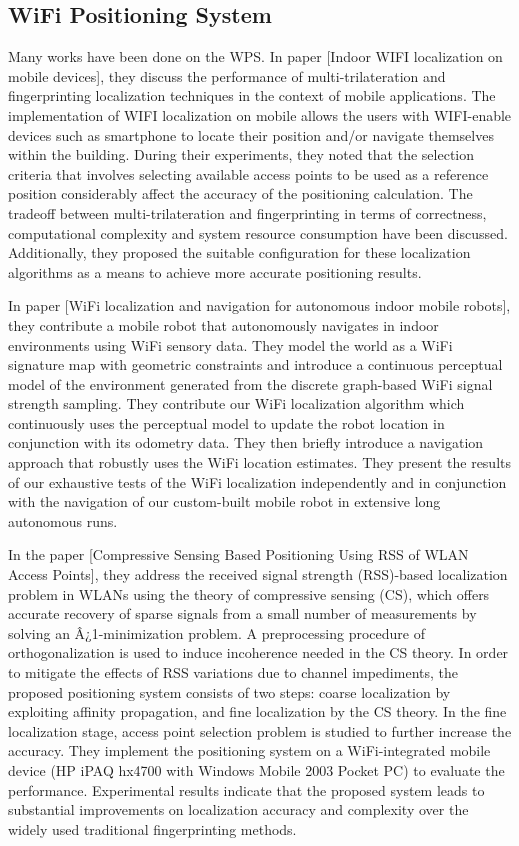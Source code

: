 \documentclass[12pt]{report}
\begin{document}
\subsection{WiFi Positioning System}
Many works have been done on the WPS. In paper [Indoor WIFI localization on mobile devices], they discuss the performance of multi-trilateration and fingerprinting localization techniques in the context of mobile applications. The implementation of WIFI localization on mobile allows the users with WIFI-enable devices such as smartphone to locate their position and/or navigate themselves within the building. During their experiments, they noted that the selection criteria that involves selecting available access points to be used as a reference position considerably affect the accuracy of the positioning calculation. The tradeoff between multi-trilateration and fingerprinting in terms of correctness, computational complexity and system resource consumption have been discussed. Additionally, they proposed the suitable configuration for these localization algorithms as a means to achieve more accurate positioning results.

In paper [WiFi localization and navigation for autonomous indoor mobile robots], they contribute a mobile robot that autonomously navigates in indoor environments using WiFi sensory data. They model the world as a WiFi signature map with geometric constraints and introduce a continuous perceptual model of the environment generated from the discrete graph-based WiFi signal strength sampling. They contribute our WiFi localization algorithm which continuously uses the perceptual model to update the robot location in conjunction with its odometry data. They then briefly introduce a navigation approach that robustly uses the WiFi location estimates. They present the results of our exhaustive tests of the WiFi localization independently and in conjunction with the navigation of our custom-built mobile robot in extensive long autonomous runs. 

In the paper [Compressive Sensing Based Positioning Using RSS of WLAN Access Points], they address the received signal strength (RSS)-based localization problem in WLANs using the theory of compressive sensing (CS), which offers accurate recovery of sparse signals from a small number of measurements by solving an Â¿1-minimization problem. A preprocessing procedure of orthogonalization is used to induce incoherence needed in the CS theory. In order to mitigate the effects of RSS variations due to channel impediments, the proposed positioning system consists of two steps: coarse localization by exploiting affinity propagation, and fine localization by the CS theory. In the fine localization stage, access point selection problem is studied to further increase the accuracy. They implement the positioning system on a WiFi-integrated mobile device (HP iPAQ hx4700 with Windows Mobile 2003 Pocket PC) to evaluate the performance. Experimental results indicate that the proposed system leads to substantial improvements on localization accuracy and complexity over the widely used traditional fingerprinting methods.
\end{document}
